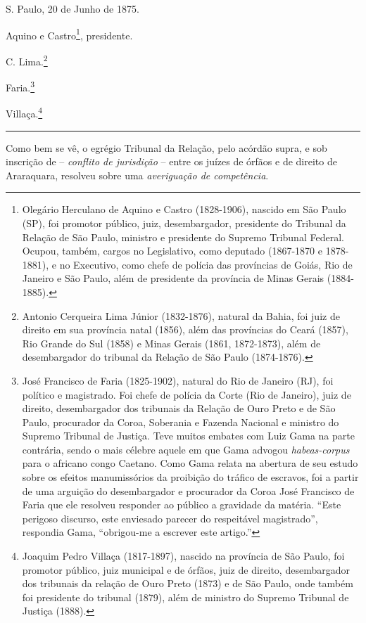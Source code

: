 S. Paulo, 20 de Junho de 1875.

Aquino e Castro\footnote{Olegário Herculano de Aquino e Castro
  (1828-1906), nascido em São Paulo (SP), foi promotor público, juiz,
  desembargador, presidente do Tribunal da Relação de São Paulo,
  ministro e presidente do Supremo Tribunal Federal. Ocupou, também,
  cargos no Legislativo, como deputado (1867-1870 e 1878-1881), e no
  Executivo, como chefe de polícia das províncias de Goiás, Rio de
  Janeiro e São Paulo, além de presidente da província de Minas Gerais
  (1884-1885).}, presidente.

C. Lima.\footnote{Antonio Cerqueira Lima Júnior (1832-1876), natural da
  Bahia, foi juiz de direito em sua província natal (1856), além das
  províncias do Ceará (1857), Rio Grande do Sul (1858) e Minas Gerais
  (1861, 1872-1873), além de desembargador do tribunal da Relação de São
  Paulo (1874-1876).}

Faria.\footnote{José Francisco de Faria (1825-1902), natural do Rio de
  Janeiro (RJ), foi político e magistrado. Foi chefe de polícia da Corte
  (Rio de Janeiro), juiz de direito, desembargador dos tribunais da
  Relação de Ouro Preto e de São Paulo, procurador da Coroa, Soberania e
  Fazenda Nacional e ministro do Supremo Tribunal de Justiça. Teve
  muitos embates com Luiz Gama na parte contrária, sendo o mais célebre
  aquele em que Gama advogou \emph{habeas-corpus} para o africano congo
  Caetano. Como Gama relata na abertura de seu estudo sobre os efeitos
  manumissórios da proibição do tráfico de escravos, foi a partir de uma
  arguição do desembargador e procurador da Coroa José Francisco de
  Faria que ele resolveu responder ao público a gravidade da matéria.
  ``Este perigoso discurso, este enviesado parecer do respeitável
  magistrado'', respondia Gama, ``obrigou-me a escrever este artigo.''}

Villaça.\footnote{Joaquim Pedro Villaça (1817-1897), nascido na
  província de São Paulo, foi promotor público, juiz municipal e de
  órfãos, juiz de direito, desembargador dos tribunais da relação de
  Ouro Preto (1873) e de São Paulo, onde também foi presidente do
  tribunal (1879), além de ministro do Supremo Tribunal de Justiça
  (1888).}

\begin{center}\rule{0.5\linewidth}{\linethickness}\end{center}

Como bem se vê, o egrégio Tribunal da Relação, pelo acórdão supra, e sob
inscrição de -- \emph{conflito de jurisdição} -- entre os juízes de
órfãos e de direito de Araraquara, resolveu sobre uma \emph{averiguação
de competência}.

